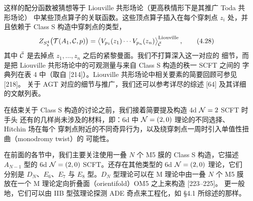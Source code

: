 
这样的配分函数被猜想等于 Liouville 共形场论（更高秩情形下是其推广 Toda 共形场论）
中某些顶点算子的关联函数。这些顶点算子插入在每个穿刺点 $z_i$ 处，并且依赖于
Class S 构造中穿刺点的类型，
\begin{equation}
  Z_{S^4_b}\big(\mathcal{T}(A_1,\mathcal{C},p)\big) =
  \big\langle V_{p_1}(z_1)\cdots V_{p_n}(z_n)\big\rangle
  ^{\text{Liouville}}_{\bar{\mathcal{C}}}\,,
  \tag{4.28}
\end{equation}
其中 $\bar{\mathcal{C}}$ 是去掉点 $z_1,\dots,z_n$ 之后的紧黎曼面。我们不打算深入这一对应的
细节，而是把 Liouville 共形场论中的可观测量与来自 Class S 构造的秩一 SCFT 之间的
字典列在表 4 中（取自 [214]）。Liouville 共形场论中相关要素的简要回顾可参见 [218]。
关于 AGT 对应的细节与推广，我们还可以参考详尽的综述 [64] 及其详细的文献列表。



在结束关于 Class S 构造的讨论之前，我们接着简要提及构造 4d $\mathcal{N}=2$ SCFT 时手头
还有的几样尚未涉及的材料，即：6d 中 $\mathcal{N}=(2,0)$ 理论的不同选择、Hitchin 场在每个
穿刺点附近的不同奇异行为，以及绕穿刺点一周时引入单值性扭曲（monodromy twist）的
可能性。



在前面的各节中，我们主要关注使用一叠 $N$ 个 M5 膜的 Class S 构造，它描述
$A_{N-1}$ 型的 6d $\mathcal{N}=(2,0)$ SCFT。还存在其他类型的 6d $\mathcal{N}=(2,0)$ 理论，它们
分别是 $D_N$、$E_6$、$E_7$ 与 $E_8$ 型。$D_N$ 型理论可以在 M 理论中由一叠
$N$ 个 M5 膜放在一个 M 理论定向折叠面（orientifold）OM5 之上来构造 [223--225]。
更一般地，它们可以由 IIB 型弦理论探测 ADE 奇点来工程化，如 §4.1 所综述的那样。

